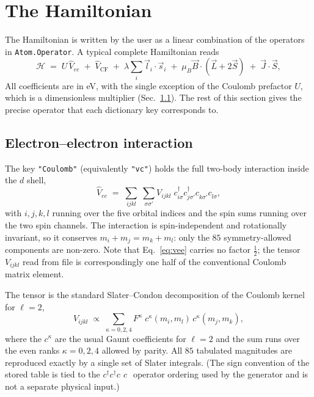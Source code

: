 \documentclass[11pt,a4paper]{article}
\newcommand{\op}[1]{\texttt{#1}}
\newcommand{\cd}[1]{c^{\dagger}_{#1}}
\newcommand{\cc}[1]{c^{\phantom{\dagger}}_{#1}}
\begin{document}
\section{The Hamiltonian}
\label{sec:ham}

The Hamiltonian is written by the user as a linear combination of the operators
in \op{Atom.Operator}.  A typical complete Hamiltonian reads
\begin{equation}
  \mathcal{H}
  \;=\; U\,\hat V_{ee}
  \;+\; \hat V_{\mathrm{CF}}
  \;+\; \lambda \sum_i \vec{l}_i\cdot\vec{s}_i
  \;+\; \mu_B\vec{B}\cdot(\vec{L}+2\vec{S})
  \;+\; \vec{J}\cdot\vec{S} ,
  \label{eq:H}
\end{equation}
All coefficients are in eV, with the single exception of the Coulomb prefactor
$U$, which is a dimensionless multiplier (Sec.~\ref{sec:coulomb}).  The rest of
this section gives the precise operator that each dictionary key corresponds
to.

\subsection{Electron--electron interaction}
\label{sec:coulomb}

The key \op{"Coulomb"} (equivalently \op{"vc"}) holds the full two-body
interaction inside the $d$ shell,
\begin{equation}
  \hat V_{ee}
  \;=\;\sum_{ijkl}\;\sum_{\sigma\sigma'}
  V_{ijkl}\;
  \cd{i\sigma}\cd{j\sigma'}\cc{k\sigma'}\cc{l\sigma} ,
  \label{eq:vee}
\end{equation}
with $i,j,k,l$ running over the five orbital indices and the spin sums running
over the two spin channels.  The interaction is spin-independent and rotationally
invariant, so it conserves $m_i+m_j=m_k+m_l$: only the $85$ symmetry-allowed
components are non-zero.  Note that Eq.~\eqref{eq:vee} carries no factor
$\tfrac12$; the tensor $V_{ijkl}$ read from file is correspondingly one half of
the conventional Coulomb matrix element.

The tensor is the standard Slater--Condon decomposition of the Coulomb kernel
for $\ell=2$,
\begin{equation}
  V_{ijkl}\;\propto\;\sum_{\kappa=0,2,4} F^{\kappa}\;
  c^{\kappa}(m_i,m_l)\,c^{\kappa}(m_j,m_k),
\end{equation}
where the $c^{\kappa}$ are the usual Gaunt coefficients for $\ell=2$ and the sum
runs over the even ranks $\kappa=0,2,4$ allowed by parity.  All $85$ tabulated
magnitudes are reproduced exactly by a single set of Slater integrals.  (The
sign convention of the stored table is tied to the
$\cd{}\cd{}\cc{}\cc{}$ operator ordering used by the generator and is not a
separate physical input.)
\end{document}
